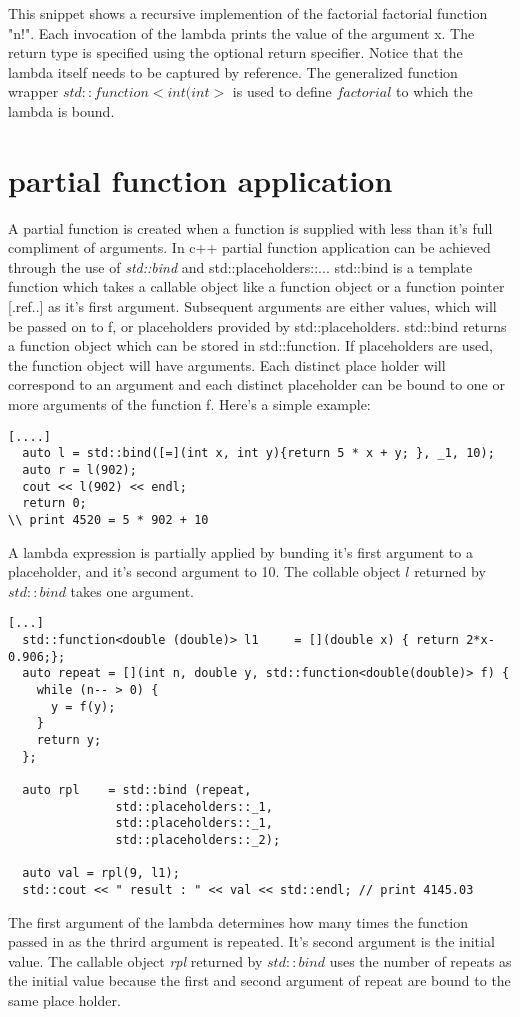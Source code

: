 \documentclass[12pt,fleqn]{article}
\begin{document}
This snippet shows a recursive implemention of the factorial factorial function "n!". 
Each invocation of the lambda prints the value of the argument x.
The return type is specified using the optional return specifier.
Notice that the lambda itself needs to be captured by reference.
The generalized function wrapper $std::function<int(int>$ is used to define $factorial$ to which the lambda is bound. 
\section*{partial function application}
A partial function is created when a function is supplied with less than it's full compliment of arguments.
In c++ partial function application can be achieved through the use of {\em std::bind} and {std::placeholders::..}.
std::bind  is a template function which takes a callable object like a function object or a function pointer [.ref..] as it's first argument.
Subsequent arguments are either values, which will be passed on to f, or placeholders provided by std::placeholders. 
std::bind returns a function object which can be stored in std::function. If placeholders are used, the function object will have arguments. 
Each distinct place holder will correspond to an argument and each distinct placeholder can be bound to one or more arguments of the function f.
Here's a simple example:

\begin{lstlisting}
[....]
  auto l = std::bind([=](int x, int y){return 5 * x + y; }, _1, 10);
  auto r = l(902);
  cout << l(902) << endl;
  return 0;
\\ print 4520 = 5 * 902 + 10
\end{lstlisting}
A lambda expression is partially applied by bunding it's first argument to a placeholder, and it's second argument to 10. 
The collable object $l$ returned by $std::bind$ takes one argument. 

\begin{lstlisting}
[...]
  std::function<double (double)> l1     = [](double x) { return 2*x-0.906;};
  auto repeat = [](int n, double y, std::function<double(double)> f) { 
    while (n-- > 0) {
      y = f(y);
    }
    return y;
  };

  auto rpl    = std::bind (repeat,
			   std::placeholders::_1,
			   std::placeholders::_1,
			   std::placeholders::_2);

  auto val = rpl(9, l1);
  std::cout << " result : " << val << std::endl; // print 4145.03

\end{lstlisting}
The first argument of the lambda determines how many times the function passed in as the thrird argument is repeated. It's second argument is the initial value. 
The callable object {\em rpl} returned by $std::bind$ uses the number of repeats as the initial value because the first and second argument of repeat are bound to the same place holder.
\end{document}
